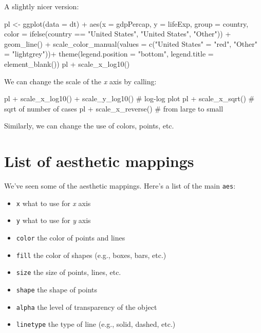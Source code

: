 \documentclass[
  letterpaper,
  DIV=11,
  numbers=noendperiod]{scrreprt}
\newenvironment{Shaded}{\begin{snugshade}}{\end{snugshade}}
\newcommand{\NormalTok}[1]{\textcolor[rgb]{0.00,0.23,0.31}{#1}}
\providecommand{\tightlist}{%
  \setlength{\itemsep}{0pt}\setlength{\parskip}{0pt}}\usepackage{longtable,booktabs,array}
\begin{document}
A slightly nicer version:

\begin{Shaded}
\begin{Highlighting}[]
\NormalTok{pl \textless{}{-} ggplot(data = dt) + }
\NormalTok{  aes(x = gdpPercap, y = lifeExp, }
\NormalTok{  group = country,}
\NormalTok{  color = ifelse(country == "United States", "United States", "Other")) +}
\NormalTok{  geom\_line() + }
\NormalTok{  scale\_color\_manual(values = c("United States" = "red", "Other" = "lightgrey"))+}
\NormalTok{  theme(legend.position = "bottom", legend.title = element\_blank())}
\NormalTok{pl + scale\_x\_log10()}
\end{Highlighting}
\end{Shaded}

We can change the scale of the \emph{x} axis by calling:

\begin{Shaded}
\begin{Highlighting}[]
\NormalTok{pl + scale\_x\_log10() + scale\_y\_log10() \# log{-}log plot}
\NormalTok{pl + scale\_x\_sqrt() \# sqrt of number of cases}
\NormalTok{pl + scale\_x\_reverse() \# from large to small}
\end{Highlighting}
\end{Shaded}

Similarly, we can change the use of colors, points, etc.

\section{List of aesthetic mappings}\label{list-of-aesthetic-mappings}

We've seen some of the aesthetic mappings. Here's a list of the main
\texttt{aes}:

\begin{itemize}
\tightlist
\item
  \texttt{x} what to use for \emph{x} axis
\item
  \texttt{y} what to use for \emph{y} axis
\item
  \texttt{color} the color of points and lines
\item
  \texttt{fill} the color of shapes (e.g., boxes, bars, etc.)
\item
  \texttt{size} the size of points, lines, etc.
\item
  \texttt{shape} the shape of points
\item
  \texttt{alpha} the level of transparency of the object
\item
  \texttt{linetype} the type of line (e.g., solid, dashed, etc.)
\end{itemize}
\end{document}
